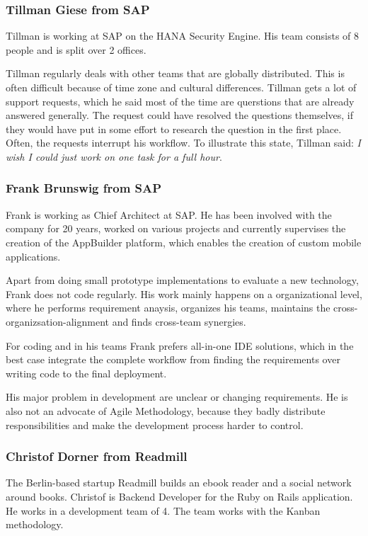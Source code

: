 \subsubsection{Tillman Giese from SAP}
Tillman is working at SAP on the HANA Security Engine. His team consists of 8 people and is split over 2 offices.

Tillman regularly deals with other teams that are globally distributed. This is often difficult because of time zone and cultural differences. Tillman gets a lot of support requests, which he said most of the time are querstions that are already answered generally. The request could have resolved the questions themselves, if they would have put in some effort to research the question in the first place. Often, the requests interrupt his workflow. To illustrate this state, Tillman said: \emph{I wish I could just work on one task for a full hour}.

\subsubsection{Frank Brunswig from SAP}
Frank is working as Chief Architect at SAP. He has been involved with the company for 20 years, worked on various projects and currently supervises the creation of the AppBuilder platform, which enables the creation of custom mobile applications.

Apart from doing small prototype implementations to evaluate a new technology, Frank does not code regularly. His work mainly happens on a organizational level, where he performs requirement anaysis, organizes his teams, maintains the cross-organizsation-alignment and finds cross-team synergies.

For coding and in his teams Frank prefers all-in-one IDE solutions, which in the best case integrate the complete workflow from finding the requirements over writing code to the final deployment.

His major problem in development are unclear or changing requirements. He is also not an advocate of Agile Methodology, because they badly distribute responsibilities and make the development process harder to control.

\subsubsection{Christof Dorner from Readmill}
The Berlin-based startup Readmill builds an ebook reader and a social network around books. Christof is Backend Developer for the Ruby on Rails application. He works in a development team of 4. The team works with the Kanban methodology.

